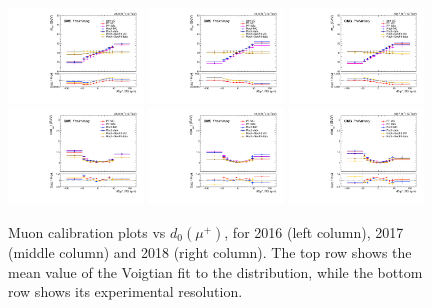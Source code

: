\begin{figure}[!htb]
      \centering
      \includegraphics[width=0.32\textwidth]{pics/muon_corr/muon_cal/2016/muP_d0_rebin_summary_mean.pdf}
      \includegraphics[width=0.32\textwidth]{pics/muon_corr/muon_cal/2017/muP_d0_rebin_summary_mean.pdf}
      \includegraphics[width=0.32\textwidth]{pics/muon_corr/muon_cal/2018/muP_d0_rebin_summary_mean.pdf}
      \includegraphics[width=0.32\textwidth]{pics/muon_corr/muon_cal/2016/muP_d0_rebin_summary_reso.pdf}
      \includegraphics[width=0.32\textwidth]{pics/muon_corr/muon_cal/2017/muP_d0_rebin_summary_reso.pdf}
      \includegraphics[width=0.32\textwidth]{pics/muon_corr/muon_cal/2018/muP_d0_rebin_summary_reso.pdf}
      \caption{Muon calibration plots vs $d_0(\mu^{+})$, for 2016 (left column), 2017 (middle column) and 2018 (right column).
               The top row shows the mean value of the Voigtian fit to the \mmm distribution, 
               while the bottom row shows its experimental resolution.}
      \label{fig:mucal_muP_d0}
\end{figure}


